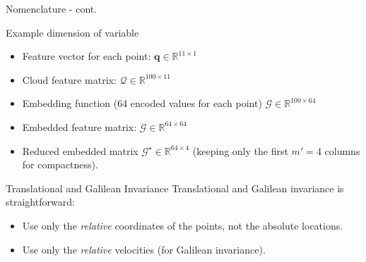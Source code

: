 \documentclass[presentation,aspectratio=169]{beamer}
\begin{document}
\begin{frame}[label={sec:org7daee78}]{Nomenclature - cont.}
\begin{block}{Example dimension of variable}
\begin{itemize}
\item Feature vector for each point:
\(\mathbf{q} \in \mathbb{R}^{11 \times 1}\)

\item Cloud feature matrix: \(\mathcal{Q} \in \mathbb{R}^{100 \times 11}\)

\item Embedding function (64 encoded values for each point)
\(\mathcal{G} \in \mathbb{R}^{100 \times 64}\)

\item Embedded feature matrix: \(\mathcal{G} \in \mathbb{R}^{64 \times 64}\)

\item Reduced embedded matrix
\(\mathcal{G}^\star \in \mathbb{R}^{64 \times 4}\) (keeping only the
first \(m'=4\) columns for compactness).
\end{itemize}
\end{block}
\end{frame}

\begin{frame}[label={sec:org5d61bcd}]{Translational and Galilean Invariance}
Translational and Galilean invariance is straightforward:

\begin{itemize}
\item Use only the \emph{relative} coordinates of the points, not the absolute  locations.

\item Use only the \emph{relative} velocities (for Galilean invariance).
\end{itemize}
\end{frame}
\end{document}
